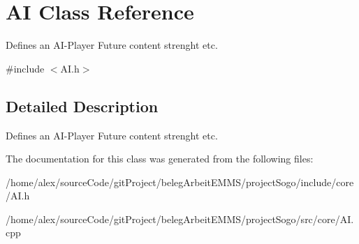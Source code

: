 \hypertarget{classAI}{\section{A\-I Class Reference}
\label{classAI}
}


Defines an A\-I-\/\-Player Future content strenght etc.  




{\ttfamily \#include $<$A\-I.\-h$>$}



\subsection{Detailed Description}
Defines an A\-I-\/\-Player Future content strenght etc. 

The documentation for this class was generated from the following files\-:\begin{DoxyCompactItemize}
\item 
/home/alex/source\-Code/git\-Project/beleg\-Arbeit\-E\-M\-M\-S/project\-Sogo/include/core/A\-I.\-h\item 
/home/alex/source\-Code/git\-Project/beleg\-Arbeit\-E\-M\-M\-S/project\-Sogo/src/core/A\-I.\-cpp\end{DoxyCompactItemize}
